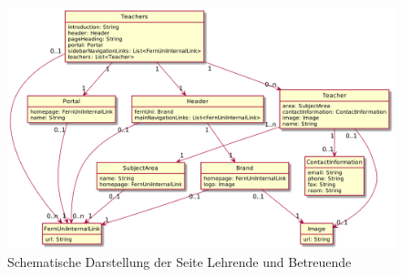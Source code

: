     \begin{figure}[htb]
        \centering
        \includegraphics[width=\textwidth]{../resources/findings/case-study-1/model/model.png}
        \caption{Schematische Darstellung der Seite Lehrende und Betreuende}
        \label{image:findingTeachersModelUml}
    \end{figure}